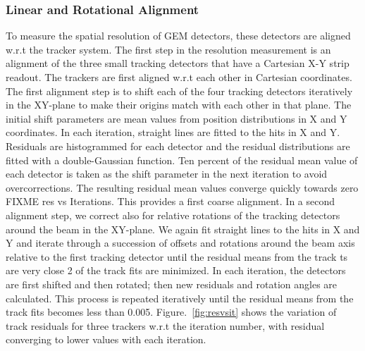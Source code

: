 \subsubsection{Linear and Rotational Alignment}
To measure the spatial resolution of GEM detectors, these detectors are aligned w.r.t the tracker system.
The first step in the resolution measurement is an alignment of the three small tracking detectors that have a Cartesian X-Y strip readout.
The trackers are first aligned w.r.t each other in Cartesian coordinates.
The first alignment step is to shift each of the four tracking detectors iteratively in the XY-plane to make their origins match with each other in that plane.
The initial shift parameters are mean values from position distributions in X and Y coordinates. In each iteration, straight lines are fitted to the hits in X and Y.
Residuals are histogrammed for each detector and the residual distributions are fitted with a double-Gaussian function.
Ten percent of the residual mean value of each detector is taken as the shift parameter in the next iteration to avoid overcorrections.
The resulting residual mean values converge quickly towards zero FIXME res vs Iterations.
This provides a first coarse alignment.
In a second alignment step, we correct also for relative rotations of the tracking detectors around the beam in the XY-plane.
We again fit straight lines to the hits in X and Y and iterate through a succession of offsets and rotations around the beam axis relative to the first tracking detector until the residual means from the track ts are very close 2 of the track fits are minimized.
In each iteration, the detectors are first shifted and then rotated; then new residuals and rotation angles are calculated.
This process is repeated iteratively until the residual means from the track fits becomes less than 0.005.
Figure.~\ref{fig:resvsit} shows the variation of track residuals for three trackers w.r.t the iteration number, with residual converging to lower values with each iteration.

